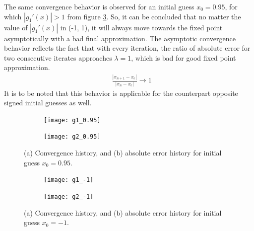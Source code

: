 \documentclass[11pt]{article} %
\begin{document}
The same convergence behavior is observed for an initial guess $x_0 = 0.95$, for which $\left|g_1'(x)\right| > 1$ from figure \ref{fig5}. So, it can be concluded that no matter the value of $\left|g_1'(x)\right|$ in (-1, 1), it will always move towards the fixed point asymptotically with a bad final approximation. The asymptotic convergence behavior reflects the fact that with every iteration, the ratio of absolute error for two consecutive iterates approaches $\lambda = 1$, which is bad for good fixed point approximation.
\begin{equation}
\begin{split}
&\frac{\left|x_{n+1} - x_e\right|}{\left|x_{n} - x_e\right|} \to 1
\end{split}
\end{equation}
It is to be noted that this behavior is applicable for the counterpart opposite signed initial guesses as well.
\begin{figure}[!htb]
    \centering
    \begin{subfigure}{.5\textwidth}
        \centering
        \texttt{[image: g1\_0.95]}
        \caption{}
        \label{fig5a}
    \end{subfigure}\hfill
    \begin{subfigure}{0.5\textwidth}
        \centering
        \texttt{[image: g2\_0.95]}
        \caption{}
        \label{fig5b}
    \end{subfigure}
    \caption{(a) Convergence history, and (b) absolute error history for initial guess $x_0 = 0.95$.}
    \label{fig5}
\end{figure}
\begin{figure}[!htb]
    \centering
    \begin{subfigure}{.5\textwidth}
        \centering
        \texttt{[image: g1\_-1]}
        \caption{}
        \label{fig6a}
    \end{subfigure}\hfill
    \begin{subfigure}{0.5\textwidth}
        \centering
        \texttt{[image: g2\_-1]}
        \caption{}
        \label{fig6b}
    \end{subfigure}
    \caption{(a) Convergence history, and (b) absolute error history for initial guess $x_0 = -1$.}
    \label{fig6}
\end{figure}
\end{document}
